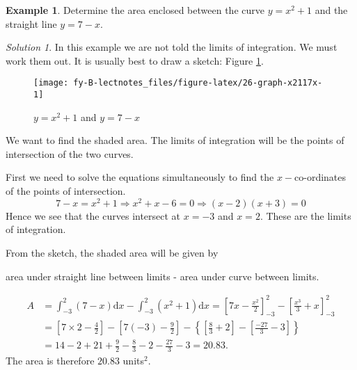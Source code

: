 \documentclass[
  english,
  11pt,
  oneside]{book}
\newcommand{\slide}{}
\theoremstyle{definition}
\theoremstyle{definition}
\newtheorem{example}{Example}[chapter]
\theoremstyle{definition}
\theoremstyle{definition}
\theoremstyle{remark}
\newtheorem*{solution}{Solution}
\begin{document}
\begin{example}
Determine the area enclosed between the curve \(y=x^2+1\) and the straight line \(y=7-x\).
\end{example}

\begin{solution}
\leavevmode

In this example we are not told the limits of integration. We must work them out. It is usually best to draw a sketch: Figure \ref{fig:26-graph-x2117x}.

\begin{figure}

{\centering \texttt{[image: fy-B-lectnotes\_files/figure-latex/26-graph-x2117x-1]} 

}

\caption{$y=x^2+1$ and $y=7-x$}\label{fig:26-graph-x2117x}
\end{figure}

We want to find the shaded area. The limits of integration will be the points of intersection of the two curves.

First we need to solve the equations simultaneously to find the \(x-\)co-ordinates of the points of intersection.
\[
7-x=x^2+1\Rightarrow x^2+x-6=0\Rightarrow (x-2)(x+3)=0
\]
Hence we see that the curves intersect at \(x=-3\) and \(x=2\). These are the limits of integration.

From the sketch, the shaded area will be given by

\begin{center}
area under straight line between limits - area under curve between limits.
\end{center}

\begin{align*}
A&=\int_{-3}^2(7-x)\mathrm{d}x - \int_{-3}^2(x^2+1)\mathrm{d}x = \left[7x-\frac{x^2}2\right]_{-3}^2 - \left[\frac{x^3}3+x\right]_{-3}^2\\
&=\left[7\times2-\frac{4}2\right]-\left[7(-3)-\frac92\right]-\left\{\left[\frac{8}3+2\right]-\left[\frac{-27}3-3\right]\right\}\\
&=14-2+21+\frac 92-\frac83-2-\frac{27}3-3=20.83.
\end{align*}
The area is therefore \(20.83\) units\(^2\).

\end{solution}

\slide

\begin{slidesonly}

\hbox{}
\slide

\end{slidesonly}
\end{document}
